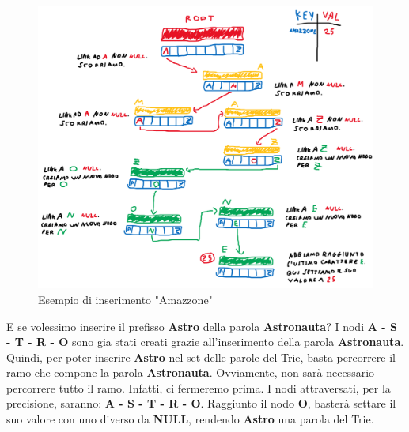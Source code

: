 \documentclass[a4paper, 12pt]{article}
\begin{document}
\clearpage
\begin{figure}
    \centering
    \includegraphics[width=13cm]{Images/esempio inserimento.png}
    \caption{Esempio di inserimento "Amazzone"}
    \label{fig:my_label}
\end{figure}

\clearpage

E se volessimo inserire il prefisso \textbf{Astro} della parola \textbf{Astronauta}? I nodi \textbf{A - S - T - R - O} sono gia stati creati grazie all'inserimento della parola \textbf{Astronauta}. Quindi, per poter inserire \textbf{Astro} nel set delle parole del Trie, basta percorrere il ramo che compone la parola \textbf{Astronauta}. Ovviamente, non sarà necessario percorrere tutto il ramo. Infatti, ci fermeremo prima. I nodi attraversati, per la precisione, saranno: \textbf{A - S - T - R - O}. Raggiunto il nodo \textbf{O}, basterà settare il suo valore con uno diverso da \textbf{NULL}, rendendo \textbf{Astro} una parola del Trie.
\end{document}
